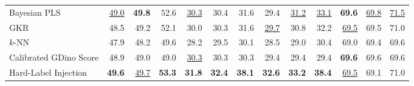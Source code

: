 \begin{table}[t]
\begin{subtable}[t]{\linewidth}
{\begin{tabular}{l|rrr|rrr|rrr|rrr}
Bayesian PLS & \underline{49.0} & \textbf{49.8} & 52.6 & \underline{30.3} & 30.4 & 31.6 & 29.4 & \underline{31.2} & \underline{33.1} & \textbf{69.6} & \underline{69.8} & \underline{71.5} \\
GKR & 48.5 & 49.2 & 52.1 & 30.0 & 30.3 & 31.6 & \underline{29.7} & 30.8 & 32.2 & \underline{69.5} & 69.5 & 71.0 \\
$k$-NN & 47.9 & 48.2 & 49.6 & 28.2 & 29.5 & 30.1 & 28.5 & 29.0 & 30.4 & 69.0 & 69.4 & 69.6 \\
Calibrated GDino Score & 48.9 & 49.0 & 49.0 & \underline{30.3} & 30.3 & 30.3 & 29.4 & 29.4 & 29.4 & \textbf{69.6} & 69.6 & 69.6 \\
Hard-Label Injection & \textbf{49.6} & \underline{49.7} & \textbf{53.3} & \textbf{31.8} & \textbf{32.4} & \textbf{38.1} & \textbf{32.6} & \textbf{33.2} & \textbf{38.4} & \underline{69.5} & 69.1 & 71.0 \\
\bottomrule
\end{tabular}
}
\end{subtable}
\end{table}
